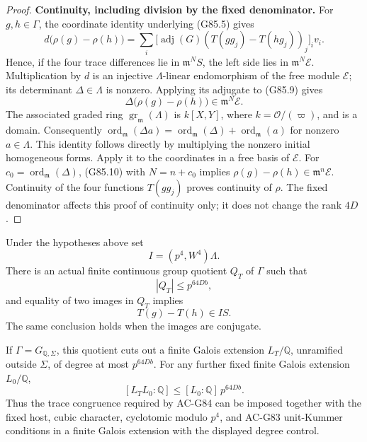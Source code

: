 \begin{proof}
\noindent\textbf{Continuity, including division by the fixed denominator.}
For \(g,h\in\Gamma\), the coordinate identity underlying (G85.5) gives
\[
 d\bigl(\rho(g)-\rho(h)\bigr)
 =
 \sum_i\bigl[\operatorname{adj}(G)
    (T(gg_j)-T(hg_j))_j\bigr]_i v_i.
 \tag{G85.9}
\]
Hence, if the four trace differences lie in
\(\mathfrak m^N S\), the left side lies in
\(\mathfrak m^N\mathcal E\).
Multiplication by \(d\) is an injective \(\Lambda\)-linear
endomorphism of the free module \(\mathcal E\); its determinant
\(\Delta\in\Lambda\) is nonzero.
Applying its adjugate to (G85.9) gives
\[
 \Delta\bigl(\rho(g)-\rho(h)\bigr)
       \in\mathfrak m^N\mathcal E.
 \tag{G85.10}
\]
The associated graded ring
\(\operatorname{gr}_{\mathfrak m}(\Lambda)\) is
\(k[X,Y]\), where \(k=\mathcal O/(\varpi)\), and is a domain.
Consequently
\(\operatorname{ord}_{\mathfrak m}(\Delta a)
=\operatorname{ord}_{\mathfrak m}(\Delta)
 +\operatorname{ord}_{\mathfrak m}(a)\)
for nonzero \(a\in\Lambda\).
This identity follows directly by multiplying the nonzero initial
homogeneous forms.
Apply it to the coordinates in a free basis of \(\mathcal E\).
For \(c_0=\operatorname{ord}_{\mathfrak m}(\Delta)\),
(G85.10) with \(N=n+c_0\) implies
\(\rho(g)-\rho(h)\in\mathfrak m^n\mathcal E\).
Continuity of the four functions \(T(gg_j)\) proves continuity of
\(\rho\).
The fixed denominator affects this proof of continuity only; it does
not change the rank \(4D\).
\end{proof}

\begin{theorem}
\label{thm:G85}
Under the hypotheses above set
\[
 I=(p^4,W^4)\Lambda.
\]
There is an actual finite continuous group quotient \(Q_T\) of
\(\Gamma\) such that
\[
 |Q_T|\le p^{64Db},
 \tag{G85.11}
\]
and equality of two images in \(Q_T\) implies
\[
 T(g)-T(h)\in IS.
 \tag{G85.12}
\]
The same conclusion holds when the images are conjugate.

If \(\Gamma=G_{\mathbb Q,\Sigma}\), this quotient cuts out a finite
Galois extension \(L_T/\mathbb Q\), unramified outside \(\Sigma\),
of degree at most \(p^{64Db}\).
For any further fixed finite Galois extension \(L_0/\mathbb Q\),
\[
 [L_TL_0:\mathbb Q]\le
 [L_0:\mathbb Q]\,p^{64Db}.
 \tag{G85.13}
\]
Thus the trace congruence required by AC-G84 can be imposed together
with the fixed host, cubic character, cyclotomic modulo \(p^4\),
and AC-G83 unit-Kummer conditions in a finite Galois extension
with the displayed degree control.
\end{theorem}

